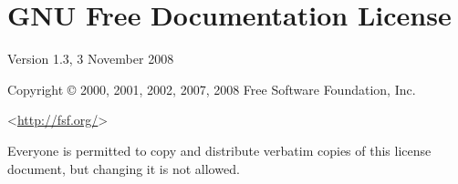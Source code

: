 \documentclass[a4paper,openany]{book}
\begin{document}
\clearpage
{}
{\scriptsize%
\frenchspacing\printindex}
\thispagestyle{plain}

\chapter*{{GNU Free Documentation License}}
\pagestyle{plain}

 Version 1.3, 3 November 2008


 Copyright \copyright{} 2000, 2001, 2002, 2007, 2008 Free Software Foundation, Inc.

 \bigskip

 <\url{http://fsf.org/}>

 \bigskip

 Everyone is permitted to copy and distribute verbatim copies
 of this license document, but changing it is not allowed.
\end{document}
